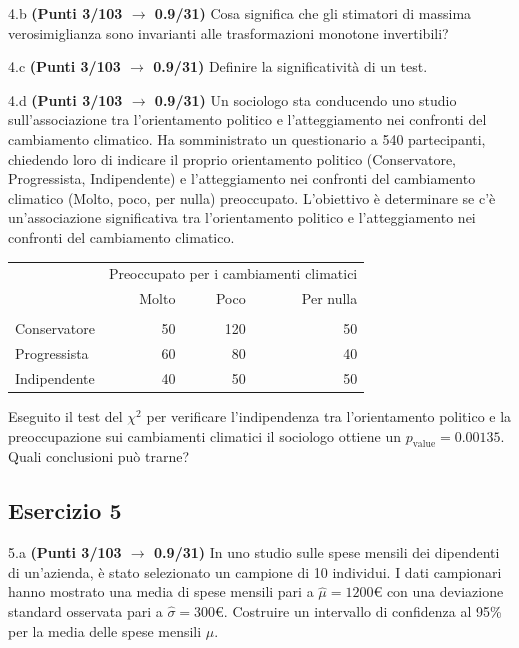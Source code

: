 \documentclass[
  11pt,
]{book}
\theoremstyle{mytheoremstyle}
\theoremstyle{mydefstyle}
\begin{document}
4.b \textbf{(Punti 3/103 \(\rightarrow\) 0.9/31)} Cosa significa che gli stimatori di massima verosimiglianza sono invarianti alle trasformazioni monotone invertibili?

4.c \textbf{(Punti 3/103 \(\rightarrow\) 0.9/31)} Definire la significatività di un test.

4.d \textbf{(Punti 3/103 \(\rightarrow\) 0.9/31)} Un sociologo sta conducendo uno studio sull'associazione tra l'orientamento politico e l'atteggiamento nei confronti del cambiamento climatico. Ha somministrato un questionario a 540 partecipanti, chiedendo loro di indicare il proprio orientamento politico (Conservatore, Progressista, Indipendente) e l'atteggiamento nei confronti del cambiamento climatico (Molto, poco, per nulla) preoccupato. L'obiettivo è determinare se c'è un'associazione significativa tra l'orientamento politico e l'atteggiamento nei confronti del cambiamento climatico.

\begin{table}[H]
\centering\centering\centering
\begin{tabular}{lrrr}
\toprule
\multicolumn{1}{c}{ } & \multicolumn{3}{c}{Preoccupato per i cambiamenti climatici} \\
\cmidrule(l{3pt}r{3pt}){2-4}
  & Molto & Poco & Per nulla\\
\midrule
\addlinespace[0.3em]
\multicolumn{4}{l}{\textbf{Orientamento politico}}\\
\hspace{1em}Conservatore & 50 & 120 & 50\\
\hspace{1em}Progressista & 60 & 80 & 40\\
\hspace{1em}Indipendente & 40 & 50 & 50\\
\bottomrule
\end{tabular}
\end{table}

Eseguito il test del \(\chi^2\) per verificare l'indipendenza tra l'orientamento politico e la preoccupazione
sui cambiamenti climatici il sociologo ottiene un \(p_\text{value}=0.00135\). Quali conclusioni può trarne?

\subsection{Esercizio 5}\label{esercizio-5-29}

5.a \textbf{(Punti 3/103 \(\rightarrow\) 0.9/31)} In uno studio sulle spese mensili dei dipendenti di un'azienda, è stato selezionato un campione di 10 individui. I dati campionari hanno mostrato una media di spese mensili pari a \(\hat\mu = 1200€\) con una deviazione standard osservata pari a \(\hat\sigma = 300€\). Costruire un intervallo di confidenza al 95\% per la media delle spese mensili \(\mu\).
\end{document}
